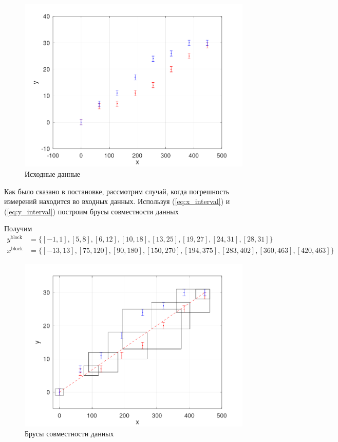 \documentclass[12pt,a4paper]{article}
\begin{document}
        \begin{figure}[H]
            \centering
            \includegraphics[width=14cm]{img/input.png}
            \caption{Исходные данные}
            \label{fig:info}
        \end{figure}
        
        Как было сказано в постановке, рассмотрим случай, когда погрешность измерений находится во входных данных. Используя (\ref{eq:x_interval}) и (\ref{eq:y_interval}) построим брусы совместности данных
        
        Получим 
        \begin{align*}
            y^{\text{block}} &= \{  [-1, 1],  [5, 8],   [6, 12],   [10, 18],   [13, 25],   [19, 27],   [24, 31],     [28, 31]\} \\
            x^{\text{block}} &= \{  [-13, 13],  [75, 120],   [90, 180],   [150, 270],   [194, 375],   [283, 402],   [360, 463],     [420, 463]\}
        \end{align*}
        
        \begin{figure}[H]
            \centering
            \includegraphics[width=14cm]{img/boxes.png}
            \caption{Брусы совместности данных}
            \label{fig:info}
        \end{figure}
        
\end{document}
